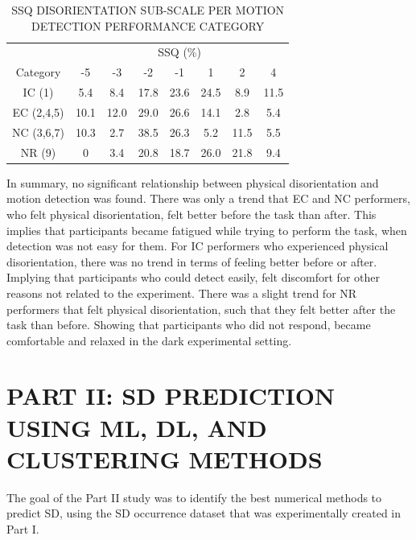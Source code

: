 \documentclass{ieeeaccess}
\begin{document}
\begin{table}[h!]
\caption{SSQ DISORIENTATION SUB-SCALE PER MOTION DETECTION PERFORMANCE CATEGORY}
\label{table3}
\centering
\begin{tabular}{c|ccccccc}
\hline
& \multicolumn{7}{c}{\centering SSQ (\%)}\\
Category & -5 & -3 & -2 & -1 & 1 & 2 & 4\\
\hline
IC (1) & 5.4 & 8.4 & 17.8 & 23.6 & 24.5 & 8.9 & 11.5\\
EC (2,4,5) & 10.1 & 12.0 & 29.0 & 26.6 & 14.1 & 2.8 & 5.4\\
NC (3,6,7) & 10.3 & 2.7 & 38.5 & 26.3 & 5.2 & 11.5 & 5.5\\
NR (9) & 0 & 3.4 & 20.8 & 18.7 & 26.0 & 21.8 & 9.4\\
\hline
\end{tabular}
\end{table}

\indent In summary, no significant relationship between physical disorientation and motion detection was found. There was only a trend that EC and NC performers, who felt physical disorientation, felt better before the task than after. This implies that participants became fatigued while trying to perform the task, when detection was not easy for them. For IC performers who experienced physical disorientation, there was no trend in terms of feeling better before or after. Implying that participants who could detect easily, felt discomfort for other reasons not related to the experiment. There was a slight trend for NR performers that felt physical disorientation, such that they felt better after the task than before. Showing that participants who did not respond, became comfortable and relaxed in the dark experimental setting.


\section{PART II: SD PREDICTION USING ML, DL, AND CLUSTERING METHODS}
The goal of the Part II study was to identify the best numerical methods to predict SD, using the SD occurrence dataset that was experimentally created in Part I.

\end{document}
